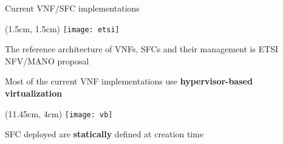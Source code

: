 \begin{frame}{Current VNF/SFC implementations}


  \begin{textblock*}{1cm}(1.5cm, 1.5cm)
    \texttt{[image: etsi]}
  \end{textblock*}

  The reference architecture of VNFs, SFCs and their management is ETSI NFV/MANO
  proposal

  \vfill{}

  Most of the current VNF implementations use \textbf{hypervisor-based
  virtualization}

  \begin{textblock*}{1cm}(11.45cm, 4cm)
    \texttt{[image: vb]}
  \end{textblock*}

  \vfill{}

  SFC deployed are \textbf{statically} defined at creation time

  \vfill{}

\end{frame}